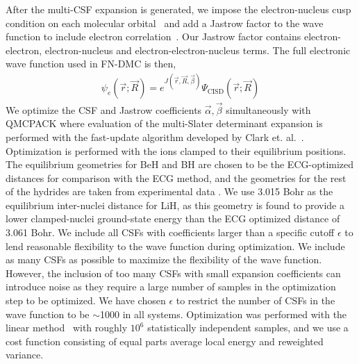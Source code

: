 \documentclass[pra,superscriptaddress,groupedaddress,twocolumn]{revtex4}
\begin{document}
After the multi-CSF expansion is generated, we impose the electron-nucleus cusp condition on each molecular orbital~\cite{cusp} and add a Jastrow factor to the wave function to include electron correlation~\cite{Kato}. Our Jastrow factor contains electron-electron, electron-nucleus and electron-electron-nucleus terms. The full electronic wave function used in FN-DMC is then,
\begin{align}
\psi_e(\vec{r};\vec{R})=e^{J(\vec{r},\vec{R},\vec{\beta})}\Psi_{\text{CISD}}(\vec{r};\vec{R})\label{eq:psie}
\end{align}
We optimize the CSF and Jastrow coefficients $\vec{\alpha},\vec{\beta}$ simultaneously with QMCPACK \cite{QMCPACK_Kim,QMCPACK_Esler} where evaluation of the multi-Slater determinant expansion is performed with the fast-update algorithm developed by Clark et. al.~\cite{Clark_Bench}. Optimization is performed with the ions clamped to their equilibrium positions. The equilibrium geometries for BeH and BH are chosen to be the ECG-optimized distances for comparison with the ECG method, and the geometries for the rest of the hydrides are taken from experimental data \cite{CCCBDB}. We use 3.015 Bohr as the equilibrium inter-nuclei distance for LiH, as this geometry is found to provide a lower clamped-nuclei ground-state energy than the ECG optimized distance of 3.061 Bohr. We include all CSFs with coefficients larger than a specific cutoff $\epsilon$ to lend reasonable flexibility to the wave function during optimization. We include as many CSFs as possible to maximize the flexibility of the wave function. However, the inclusion of too many CSFs with small expansion coefficients can introduce noise as they require a large number of samples in the optimization step to be optimized. We have chosen $\epsilon$ to restrict the number of CSFs in the wave function to be $\sim$1000 in all systems. Optimization was performed with the linear method~\cite{Umrigar_Linear} with roughly $10^6$ statistically independent samples, and we use a cost function consisting of equal parts average local energy and reweighted variance.

%
\end{document}
